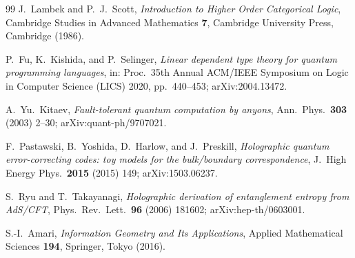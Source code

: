 \documentclass[12pt]{article}
\theoremstyle{definition}
\theoremstyle{remark}
\begin{document}
\begin{thebibliography}{99}
J.~Lambek and P.~J.~Scott,
\emph{Introduction to Higher Order Categorical Logic},
Cambridge Studies in Advanced Mathematics \textbf{7}, Cambridge University Press, Cambridge (1986).

P.~Fu, K.~Kishida, and P.~Selinger,
\emph{Linear dependent type theory for quantum programming languages},
in: Proc.\ 35th Annual ACM/IEEE Symposium on Logic in Computer Science (LICS) 2020, pp.~440--453; arXiv:2004.13472.

A.~Yu.~Kitaev,
\emph{Fault-tolerant quantum computation by anyons},
Ann.\ Phys.\ \textbf{303} (2003) 2--30; arXiv:quant-ph/9707021.

F.~Pastawski, B.~Yoshida, D.~Harlow, and J.~Preskill,
\emph{Holographic quantum error-correcting codes: toy models for the bulk/boundary correspondence},
J.\ High Energy Phys.\ \textbf{2015} (2015) 149; arXiv:1503.06237.

S.~Ryu and T.~Takayanagi,
\emph{Holographic derivation of entanglement entropy from AdS/CFT},
Phys.\ Rev.\ Lett.\ \textbf{96} (2006) 181602; arXiv:hep-th/0603001.

S.-I.~Amari,
\emph{Information Geometry and Its Applications},
Applied Mathematical Sciences \textbf{194}, Springer, Tokyo (2016).

\end{thebibliography}
\end{document}

